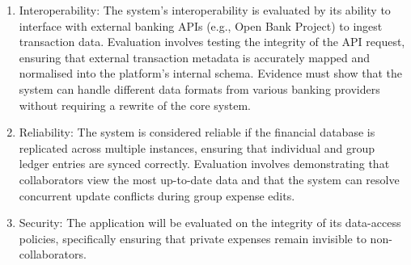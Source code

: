\begin{enumerate}
\item Interoperability: The system’s interoperability is evaluated by its ability to interface with external banking APIs (e.g., Open Bank Project) to ingest transaction data. Evaluation involves testing the integrity of the API request, ensuring that external transaction metadata is accurately mapped and normalised into the platform’s internal schema. Evidence must show that the system can handle different data formats from various banking providers without requiring a rewrite of the core system.
\item Reliability: The system is considered reliable if the financial database is replicated across multiple instances, ensuring that individual and group ledger entries are synced correctly. Evaluation involves demonstrating that collaborators view the most up-to-date data and that the system can resolve concurrent update conflicts during group expense edits.
\item Security: The application will be evaluated on the integrity of its data-access policies, specifically ensuring that private expenses remain invisible to non-collaborators. 
\end{enumerate}

